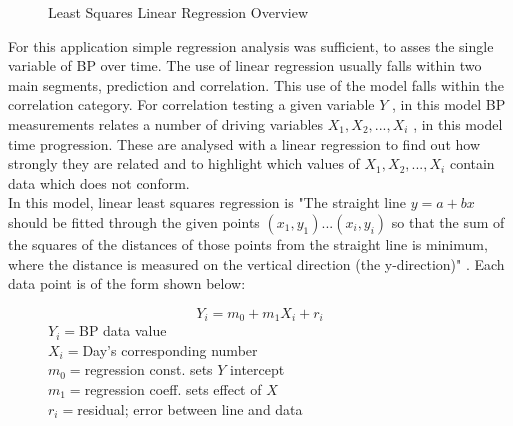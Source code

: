 \documentclass[11pt]{article}
\begin{document}
\begin{figure}
\centering
{}
\caption{Least Squares Linear Regression Overview \cite{linregdia} \label{linregfig}}
\end{figure} 
For this application simple regression analysis was sufficient, to asses the single variable of BP over time. The use of linear regression usually falls within two main segments, prediction and correlation. This use of the model falls within the correlation category. For correlation testing a given variable $Y$ , in this model BP measurements relates a number of driving variables $X_1, X_2,...,X_i$ , in this model time progression. These are analysed with a linear regression to find out how strongly they are related and to highlight which values of $X_1, X_2,...,X_i$ contain data which does not conform.
\\ \indent 
In this model, linear least squares regression is "The straight line $y=a + bx$ should be fitted through the given points $(x_1,y_1)...(x_i,y_i)$ so that the sum of the squares of the distances of those points from the straight line is minimum, where the distance is measured on the vertical direction (the y-direction)" \cite{Kryzig}. Each data point is of the form shown below:
\begin{figure}[h]
\begin{equation}
Y_i=m_0 +m_1X_i +r_i
\end{equation} 
\endminipage\hfill
{}%
$Y_i=$BP data value
\\$X_i=$Day's corresponding number
\\$m_0=$regression const. sets $Y$ intercept
\\$m_1=$regression coeff. sets effect of $X$
\\$r_i=$residual; error between line and data
\endminipage
\end{figure}
\end{document}
